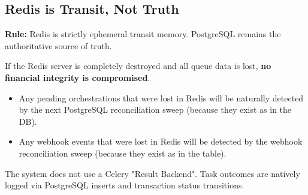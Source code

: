 \vspace{0.8cm}

\subsection{Redis is Transit, Not Truth}

\begin{tcolorbox}[infobox={The Role of Redis}]
\textbf{Rule:} Redis is strictly ephemeral transit memory. PostgreSQL remains the authoritative source of truth.
\end{tcolorbox}

If the Redis server is completely destroyed and all queue data is lost, \textbf{no financial integrity is compromised}. 
\begin{itemize}
    \item Any pending orchestrations that were lost in Redis will be naturally detected by the next PostgreSQL reconciliation sweep (because they exist as  in the DB).
    \item Any webhook events that were lost in Redis will be detected by the webhook reconciliation sweep (because they exist as  in the  table).
\end{itemize}
The system does not use a Celery "Result Backend". Task outcomes are natively logged via PostgreSQL  inserts and transaction status transitions.

